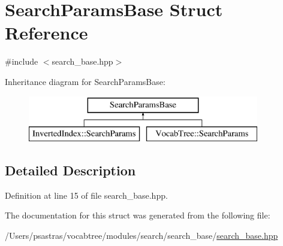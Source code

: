 \hypertarget{structSearchParamsBase}{\section{Search\-Params\-Base Struct Reference}
\label{structSearchParamsBase}
}


{\ttfamily \#include $<$search\-\_\-base.\-hpp$>$}

Inheritance diagram for Search\-Params\-Base\-:\begin{figure}[H]
\begin{center}
\leavevmode
\includegraphics[height=2.000000cm]{structSearchParamsBase}
\end{center}
\end{figure}


\subsection{Detailed Description}


Definition at line 15 of file search\-\_\-base.\-hpp.



The documentation for this struct was generated from the following file\-:\begin{DoxyCompactItemize}
\item 
/\-Users/psastras/vocabtree/modules/search/search\-\_\-base/\hyperlink{search__base_8hpp}{search\-\_\-base.\-hpp}\end{DoxyCompactItemize}
